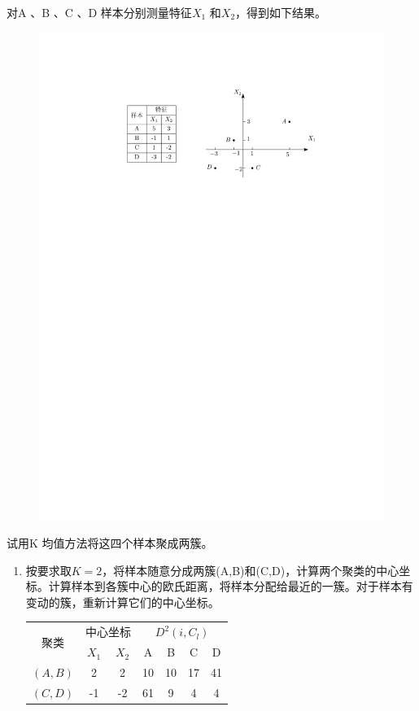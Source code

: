 \begin{example}
    对A 、B 、C 、D 样本分别测量特征$X_1$ 和$X_2$，得到如下结果。
    \begin{figure}[htbp]
        \centering
        \includegraphics{image/K均值.pdf}
    \end{figure}
    试用K 均值方法将这四个样本聚成两簇。
    \begin{enumerate}
        \item 按要求取$K = 2$，将样本随意分成两簇(A,B)和(C,D)，计算两个聚类的中心坐标。计算样本到各簇中心的欧氏距离，将样本分配给最近的一簇。对于样本有变动的簇，重新计算它们的中心坐标。
        \begin{table}[htbp]
            \centering
            \begin{tabular}{|c|c|c|c|c|c|c|}
            \hline
            \multirow{2}[4]{*}{聚类} & \multicolumn{2}{c|}{中心坐标} & \multicolumn{4}{c|}{$D^2(i,C_l)$} \bigstrut\\
        \cline{2-7}        & $X_1$ & $X_2$ & A   & B   & C   & D \bigstrut\\
            \hline
            $(A,B)$ & 2   & 2   & 10  & 10  & 17  & 41 \bigstrut\\
            \hline
            $(C,D)$ & -1  & -2  & 61  & 9   & 4   & 4 \bigstrut\\
            \hline
            \end{tabular}%
        \end{table}%


\end{enumerate}
\end{example}
